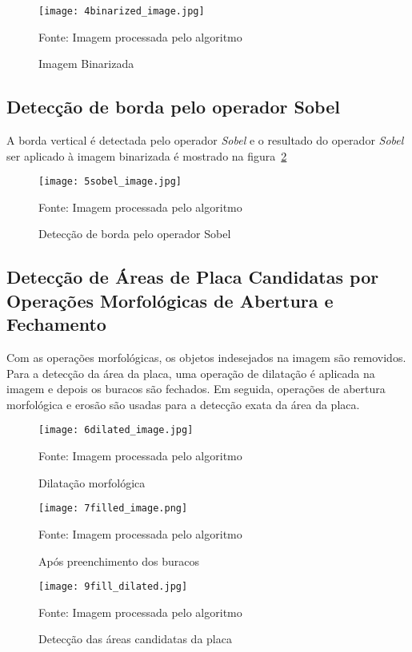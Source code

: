 \begin{figure}[H]
	\centering
	\texttt{[image: 4binarized\_image.jpg]}
	\caption{Imagem Binarizada}
Fonte: Imagem processada pelo algoritmo
	\label{fig:ext_binarized_image}
\end{figure}

\subsection{Detecção de borda pelo operador Sobel}

A borda vertical é detectada pelo operador \emph{Sobel} e o resultado do operador \emph{Sobel}
ser aplicado à imagem binarizada é mostrado na figura~\ref{fig:ext_edge_detection_sobel}

\begin{figure}[H]
	\centering
	\texttt{[image: 5sobel\_image.jpg]}
	\caption{Detecção de borda pelo operador Sobel}
Fonte: Imagem processada pelo algoritmo
	\label{fig:ext_edge_detection_sobel}
\end{figure}

\subsection{Detecção de Áreas de Placa Candidatas por Operações Morfológicas de Abertura e Fechamento}

Com as operações morfológicas, os objetos indesejados na imagem são removidos.
Para a detecção da área da placa, uma operação de dilatação é aplicada na imagem
e depois os buracos são fechados. Em seguida, operações de abertura morfológica
e erosão são usadas para a detecção exata da área da placa.

\begin{figure}[H]
	\centering
	\texttt{[image: 6dilated\_image.jpg]}
	\caption{Dilatação morfológica}
Fonte: Imagem processada pelo algoritmo
	\label{fig:ext_morphological_dilation}
\end{figure}

\begin{figure}[H]
	\centering
	\texttt{[image: 7filled\_image.png]}
	\caption{Após preenchimento dos buracos}
Fonte: Imagem processada pelo algoritmo
	\label{fig:ext_holes_filled}
\end{figure}

\begin{figure}[H]
	\centering
	\texttt{[image: 9fill\_dilated.jpg]}
	\caption{Detecção das áreas candidatas da placa}
Fonte: Imagem processada pelo algoritmo
	\label{fig:ext_plate_area_detection}
\end{figure}

